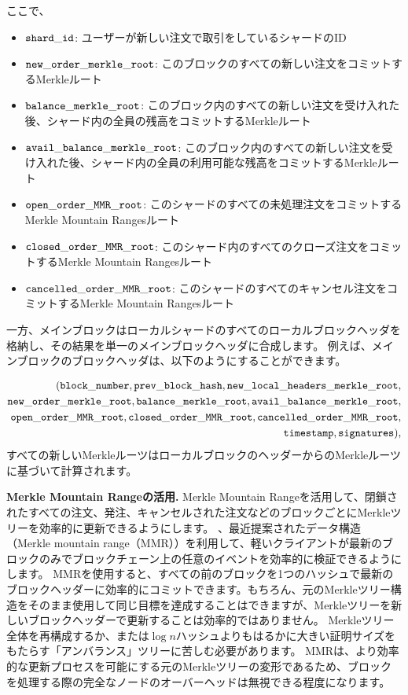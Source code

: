 ここで、
\begin{itemize}
\item ${\mathtt{shard\_id}}$: ユーザーが新しい注文で取引をしているシャードのID 
\item ${\mathtt{new\_order\_merkle\_root}}$: このブロックのすべての新しい注文をコミットするMerkleルート
\item ${\mathtt{balance\_merkle\_root}}$: このブロック内のすべての新しい注文を受け入れた後、シャード内の全員の残高をコミットするMerkleルート  
\item ${\mathtt{avail\_balance\_merkle\_root}}$: このブロック内のすべての新しい注文を受け入れた後、シャード内の全員の利用可能な残高をコミットするMerkleルート
\item ${\mathtt{open\_order\_MMR\_root}}$: このシャードのすべての未処理注文をコミットするMerkle Mountain Rangesルート
\item ${\mathtt{closed\_order\_MMR\_root}}$: このシャード内のすべてのクローズ注文をコミットするMerkle Mountain Rangesルート
\item ${\mathtt{cancelled\_order\_MMR\_root}}$: このシャードのすべてのキャンセル注文をコミットするMerkle Mountain Rangesルート 
\end{itemize}

一方、メインブロックはローカルシャードのすべてのローカルブロックヘッダを格納し、その結果を単一のメインブロックヘッダに合成します。 例えば、メインブロックのブロックヘッダは、以下のようにすることができます。

\begin{align*}
({\mathtt{block\_number}}, {\mathtt{prev\_block\_hash}}, {\mathtt{new\_local\_headers\_merkle\_root}}, \\ {\mathtt{new\_order\_merkle\_root}}, {\mathtt{balance\_merkle\_root}}, {\mathtt{avail\_balance\_merkle\_root}}, \\ {\mathtt{open\_order\_MMR\_root}}, {\mathtt{closed\_order\_MMR\_root}}, {\mathtt{cancelled\_order\_MMR\_root}},\\ {\mathtt{timestamp}}, {\mathtt{signatures}}),
\end{align*}
すべての新しいMerkleルーツはローカルブロックのヘッダーからのMerkleルーツに基づいて計算されます。

\textbf{Merkle Mountain Rangeの活用.}  Merkle Mountain Rangeを活用して、閉鎖されたすべての注文、発注、キャンセルされた注文などのブロックごとにMerkleツリーを効率的に更新できるようにします。 、最近提案されたデータ構造（Merkle mountain range（MMR））を利用して、軽いクライアントが最新のブロックのみでブロックチェーン上の任意のイベントを効率的に検証できるようにします。
MMRを使用すると、すべての前のブロックを1つのハッシュで最新のブロックヘッダーに効率的にコミットできます。もちろん、元のMerkleツリー構造をそのまま使用して同じ目標を達成することはできますが、Merkleツリーを新しいブロックヘッダーで更新することは効率的ではありません。 Merkleツリー全体を再構成するか、または$\log{n}$ハッシュよりもはるかに大きい証明サイズをもたらす「アンバランス」ツリーに苦しむ必要があります。 MMRは、より効率的な更新プロセスを可能にする元のMerkleツリーの変形であるため、ブロックを処理する際の完全なノードのオーバーヘッドは無視できる程度になります。

